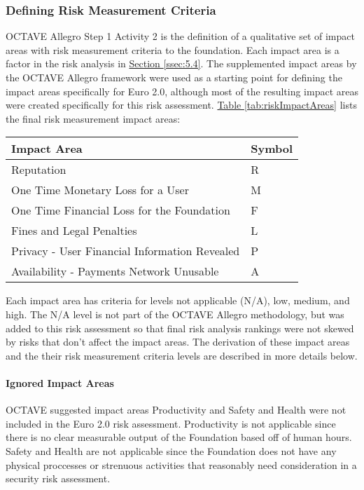\documentclass[12pt]{article} %
\newcommand{\hypertableref}[1]{\hyperref[#1]{Table \ref{#1}}}
\newcommand{\hypersectionref}[1]{\hyperref[#1]{Section \ref{#1}}}
\begin{document}
{\subsubsection{Defining Risk Measurement Criteria} \label{sssec:5.1:defining}

OCTAVE Allegro Step 1 Activity 2 is the definition of a qualitative set of impact areas with risk measurement criteria to the foundation. Each impact area is a factor in the risk analysis in \hypersectionref{ssec:5.4}. The supplemented impact areas by the OCTAVE Allegro framework were used as a starting point for defining the impact areas specifically for Euro 2.0, although most of the resulting impact areas were created specifically for this risk assessment. \hypertableref{tab:riskImpactAreas} lists the final risk measurement impact areas:

\begin{center}
\begin{tabular}{ | l | l |}
  \hline
  \textbf{Impact Area} & \textbf{Symbol}
  \\ \hline
  Reputation & R
  \\ \hline
  One Time Monetary Loss for a User & M
  \\ \hline
  One Time Financial Loss for the Foundation & F
  \\ \hline
  Fines and Legal Penalties & L
  \\ \hline
  Privacy - User Financial Information Revealed & P
  \\ \hline
  Availability - Payments Network Unusable & A
  \\ \hline
\end{tabular}
\end{center}
\label{tab:riskImpactAreas}

Each impact area has criteria for levels not applicable (N/A), low, medium, and high. The N/A level is not part of the OCTAVE Allegro methodology, but was added to this risk assessment so that final risk analysis rankings were not skewed by risks that don't affect the impact areas. The derivation of these impact areas and the their risk measurement criteria levels are described in more details below.

\paragraph{Ignored Impact Areas}

OCTAVE suggested impact areas Productivity and Safety and Health were not included in the Euro 2.0 risk assessment. Productivity is not applicable since there is no clear measurable output of the Foundation based off of human hours. Safety and Health are not applicable since the Foundation does not have any physical proccesses or strenuous activities that reasonably need consideration in a security risk assessment.

}
\end{document}
